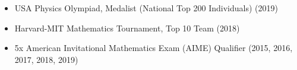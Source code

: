 \documentclass[letterpaper,11pt]{article}
\newcommand{\resitem}[1]{\item[--] #1 \vspace{-8pt}}
\newcommand{\myitem}[1]{\item[--] #1 \vspace{-8pt}}
\newcommand{\mysubitem}[1]{\item #1 \vspace{-4pt}}
\begin{document}
\begin{itemize}[leftmargin=*]
	\resitem{USA Physics Olympiad, Medalist (National Top 200 Individuals) (2019)}
	\resitem {Harvard-MIT Mathematics Tournament, Top 10 Team (2018)}
	\resitem {5x American Invitational Mathematics Exam (AIME) Qualifier (2015, 2016, 2017, 2018, 2019)}
		
			

\end{itemize}
\end{document}
